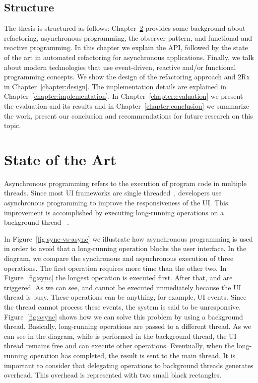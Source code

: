 \documentclass[type=bsc,accentcolor=tud9c]{tudthesis}
\newcommand{\toolcore}{\textsc{2Rx}}
\begin{document}
\section{Structure}
The thesis is structured as follows: Chapter~\ref{chapter:stateOfTheArt} provides some background about refactoring, asynchronous programming, the observer pattern, and functional and reactive programming. In this chapter we explain the  API, followed by the state of the art in automated refactoring for asynchronous applications. Finally, we talk about modern technologies that use event-driven, reactive and/or functional programming concepts. We show the design of the refactoring approach and \toolcore{} in Chapter~\ref{chapter:design}. The implementation details are explained in Chapter~\ref{chapter:implementation}. In Chapter~\ref{chapter:evaluation} we present the evaluation and its results and in Chapter~\ref{chapter:conclusion} we summarize the work, present our conclusion and recommendations for future research on this topic.

\chapter{State of the Art}
\label{chapter:stateOfTheArt}
Asynchronous programming refers to the execution of program code in multiple threads. Since most UI frameworks are single threaded~\cite{uiSingleThreaded}, developers use asynchronous programming to improve the responsiveness of the UI. This improvement is accomplished by executing long-running operations on a background thread ~\cite{paperAsyncMobile, asyncProgramming}.

In Figure~\ref{fig:sync-vs-async} we illustrate how asynchronous programming is used in order to avoid that a long-running operation blocks the user interface. In the diagram, we compare the synchronous and asynchronous execution of three operations. The first operation requires more time than the other two. In Figure~\ref{fig:sync} the longest operation is executed first. After that,  and  are triggered. As we can see,  and  cannot be executed immediately because the UI thread is busy. These operations can be anything, for example, UI events. Since the thread cannot process these events, the system is said to be unresponsive. Figure~\ref{fig:async} shows how we can solve this problem by using a background thread. Basically, long-running operations are passed to a different thread. As we can see in the diagram, while  is performed in the background thread, the UI thread remains free and can execute other operations. Eventually, when the long-running operation has completed, the result is sent to the main thread. It is important to consider that delegating operations to background threads generates overhead. This overhead is represented with two small black rectangles.
\end{document}
